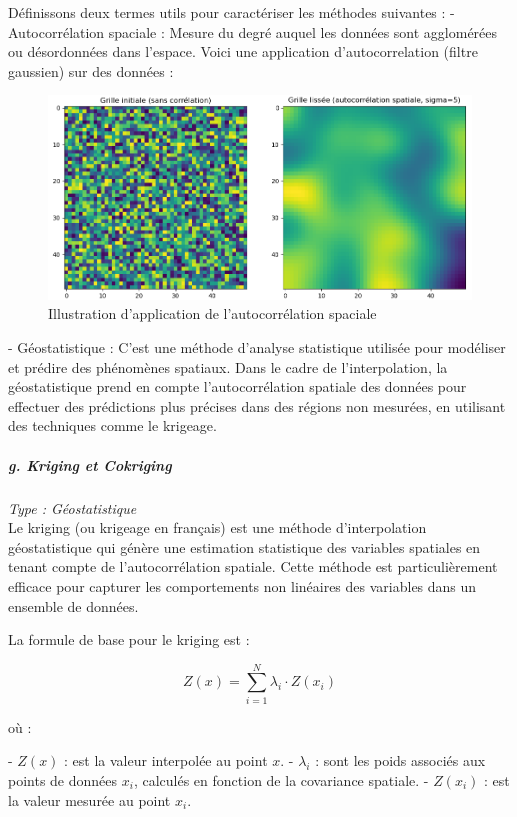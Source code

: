 Définissons deux termes utils pour caractériser les méthodes suivantes :
- Autocorrélation spaciale : Mesure du degré auquel les données sont agglomérées ou désordonnées dans l'espace. Voici une application d'autocorrelation (filtre gaussien) sur des données :
\begin{figure}[H]
    \centering
    \includegraphics[width=1\textwidth]{images/autocorrelation.png}
    \caption{Illustration d'application de l'autocorrélation spaciale}
    \label{fig:autocorrelation}
\end{figure}
- Géostatistique : C'est une méthode d'analyse statistique utilisée pour modéliser et prédire des phénomènes spatiaux. Dans le cadre de l'interpolation, la géostatistique prend en compte l'autocorrélation spatiale des données pour effectuer des prédictions plus précises dans des régions non mesurées, en utilisant des techniques comme le krigeage.



\subparagraph{g. Kriging et Cokriging \cite{palmer2009, kringing}}
\textit{Type : Géostatistique} \\
Le kriging (ou krigeage en français) est une méthode d'interpolation géostatistique qui génère une estimation statistique des variables spatiales en tenant compte de l'autocorrélation spatiale. Cette méthode est particulièrement efficace pour capturer les comportements non linéaires des variables dans un ensemble de données.

La formule de base pour le kriging est :

\begin{equation}
    Z(x) = \sum_{i=1}^{N} \lambda_i \cdot Z(x_i)
\end{equation}

où :

- \( Z(x) \) : est la valeur interpolée au point \( x \).
- \( \lambda_i \) : sont les poids associés aux points de données \( x_i \), calculés en fonction de la covariance spatiale.
- \( Z(x_i) \) : est la valeur mesurée au point \( x_i \).

